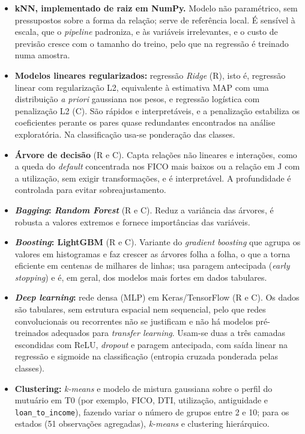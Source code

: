 \begin{itemize}
  \item \textbf{kNN, implementado de raiz em NumPy.} Modelo não paramétrico, sem pressupostos sobre a forma da relação; serve de referência local. É sensível à escala, que o \textit{pipeline} padroniza, e às variáveis irrelevantes, e o custo de previsão cresce com o tamanho do treino, pelo que na regressão é treinado numa amostra.
  \item \textbf{Modelos lineares regularizados:} regressão \textit{Ridge} (R), isto é, regressão linear com regularização L2, equivalente à estimativa MAP com uma distribuição \textit{a priori} gaussiana nos pesos, e regressão logística com penalização L2 (C). São rápidos e interpretáveis, e a penalização estabiliza os coeficientes perante os pares quase redundantes encontrados na análise exploratória. Na classificação usa-se ponderação das classes.
  \item \textbf{Árvore de decisão} (R e C). Capta relações não lineares e interações, como a queda do \textit{default} concentrada nos FICO mais baixos ou a relação em J com a utilização, sem exigir transformações, e é interpretável. A profundidade é controlada para evitar sobreajustamento.
  \item \textbf{\textit{Bagging}: \textit{Random Forest}} (R e C). Reduz a variância das árvores, é robusta a valores extremos e fornece importâncias das variáveis.
  \item \textbf{\textit{Boosting}: LightGBM} (R e C). Variante do \textit{gradient boosting} que agrupa os valores em histogramas e faz crescer as árvores folha a folha, o que a torna eficiente em centenas de milhares de linhas; usa paragem antecipada (\textit{early stopping}) e é, em geral, dos modelos mais fortes em dados tabulares.
  \item \textbf{\textit{Deep learning}:} rede densa (MLP) em Keras/\allowbreak TensorFlow (R e C). Os dados são tabulares, sem estrutura espacial nem sequencial, pelo que redes convolucionais ou recorrentes não se justificam e não há modelos pré-treinados adequados para \textit{transfer learning}. Usam-se duas a três camadas escondidas com ReLU, \textit{dropout} e paragem antecipada, com saída linear na regressão e sigmoide na classificação (entropia cruzada ponderada pelas classes).
  \item \textbf{Clustering:} \textit{k-means} e modelo de mistura gaussiana sobre o perfil do mutuário em T0 (por exemplo, FICO, DTI, utilização, antiguidade e \texttt{loan\_to\_income}), fazendo variar o número de grupos entre 2 e 10; para os estados (51 observações agregadas), \textit{k-means} e clustering hierárquico.
\end{itemize}

